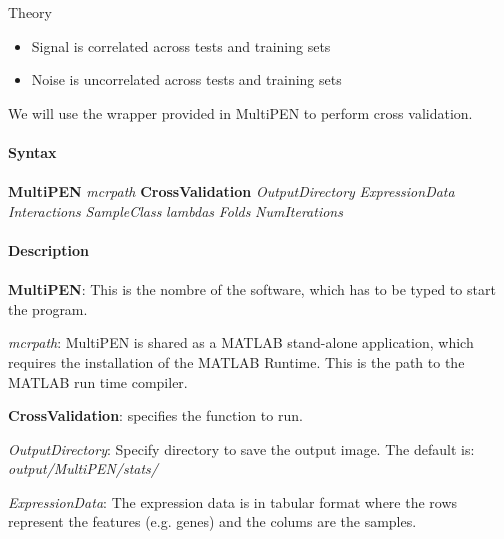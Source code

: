 \documentclass[11pt, oneside]{article}   	%
\begin{document}
Theory

\begin{itemize}

   \item Signal is correlated across tests and training sets
   
   \item Noise is uncorrelated across tests and training sets
   
\end{itemize}




We will use the wrapper provided in MultiPEN to perform cross validation. 

\paragraph{Syntax}
\paragraph{}


\begin{framed}

   {\bf MultiPEN} {\it mcrpath} {\bf CrossValidation} {\it OutputDirectory} {\it ExpressionData} {\it Interactions} 
   {\it SampleClass} {\it lambdas} {\it Folds} {\it  NumIterations}

\end{framed}


\paragraph{Description}
\paragraph{}


{\bf MultiPEN}:  This is the nombre of the software, which has to be typed to start the program.

{\it mcrpath}: MultiPEN is shared as a MATLAB stand-alone application, which requires the installation of the MATLAB Runtime. This is the path to the MATLAB run time compiler.

{\bf CrossValidation}: specifies the function to run.

{\it OutputDirectory}:  Specify directory to save the output image. The default is: {\it output/MultiPEN/stats/} 

{\it ExpressionData}: The expression data is in tabular format where the rows represent the features (e.g. genes) and the colums are the samples.
\end{document}
